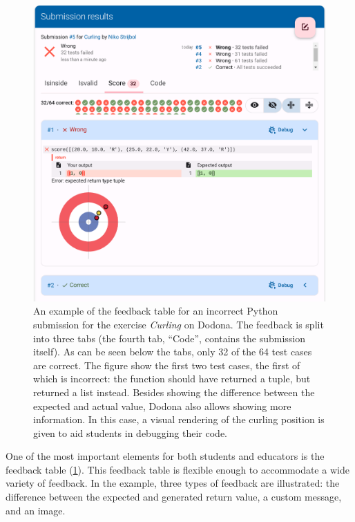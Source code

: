 \documentclass[../main]{subfiles}
\begin{document}
\begin{figure}
    \begin{wide}
        \includegraphics[width=\linewidth]{curling}
    \end{wide}
    \caption{
        An example of the feedback table for an incorrect Python submission for the exercise \textit{Curling} on Dodona.
        The feedback is split into three tabs (the fourth tab, ``Code'', contains the submission itself).
        As can be seen below the tabs, only 32 of the 64 test cases are correct.
        The figure show the first two test cases, the first of which is incorrect: the function should have returned a tuple, but returned a list instead.
        Besides showing the difference between the expected and actual value, Dodona also allows showing more information.
        In this case, a visual rendering of the curling position is given to aid students in debugging their code.
    }
    \label{fig:curling-feedback-table}
\end{figure}

One of the most important elements for both students and educators is the feedback table (\cref{fig:curling-feedback-table}).
This feedback table is flexible enough to accommodate a wide variety of feedback.
In the example, three types of feedback are illustrated: the difference between the expected and generated return value, a custom message, and an image.
\end{document}

